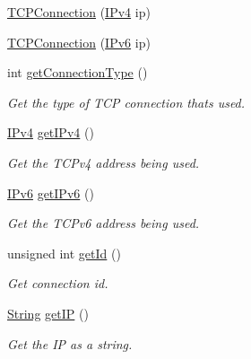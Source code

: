 \begin{DoxyCompactItemize}
\item 
\hyperlink{class_rad_j_a_v_1_1_networking_1_1_t_c_p_connection_a0fab77382e716af1b1c425f9d5102fc2}{T\+C\+P\+Connection} (\hyperlink{class_rad_j_a_v_1_1_networking_1_1_i_pv4}{I\+Pv4} ip)
\item 
\hyperlink{class_rad_j_a_v_1_1_networking_1_1_t_c_p_connection_ae181a2c7528971d495bcefaf437729a5}{T\+C\+P\+Connection} (\hyperlink{class_rad_j_a_v_1_1_networking_1_1_i_pv6}{I\+Pv6} ip)
\item 
int \hyperlink{class_rad_j_a_v_1_1_networking_1_1_t_c_p_connection_ab3753143cc5c17927826650189c4760a}{get\+Connection\+Type} ()
\begin{DoxyCompactList}\small\item\em Get the type of T\+CP connection that\textquotesingle{}s used. \end{DoxyCompactList}\item 
\hyperlink{class_rad_j_a_v_1_1_networking_1_1_i_pv4}{I\+Pv4} \hyperlink{class_rad_j_a_v_1_1_networking_1_1_t_c_p_connection_afe488c0f221c460086b7b8e11e9c9163}{get\+I\+Pv4} ()
\begin{DoxyCompactList}\small\item\em Get the T\+C\+Pv4 address being used. \end{DoxyCompactList}\item 
\hyperlink{class_rad_j_a_v_1_1_networking_1_1_i_pv6}{I\+Pv6} \hyperlink{class_rad_j_a_v_1_1_networking_1_1_t_c_p_connection_a49cbcbef604c97fb4381d7e2982e355e}{get\+I\+Pv6} ()
\begin{DoxyCompactList}\small\item\em Get the T\+C\+Pv6 address being used. \end{DoxyCompactList}\item 
unsigned int \hyperlink{class_rad_j_a_v_1_1_networking_1_1_t_c_p_connection_a79c163ef7d1d0d1ed4179e9dab39cb2f}{get\+Id} ()
\begin{DoxyCompactList}\small\item\em Get connection id. \end{DoxyCompactList}\item 
\hyperlink{class_rad_j_a_v_1_1_string}{String} \hyperlink{class_rad_j_a_v_1_1_networking_1_1_t_c_p_connection_a380090258c8b5aa6c2f9b0b7c0bec24c}{get\+IP} ()
\begin{DoxyCompactList}\small\item\em Get the IP as a string. \end{DoxyCompactList}\end{DoxyCompactItemize}
